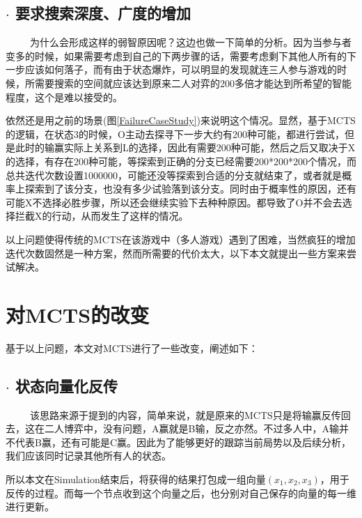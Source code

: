 \documentclass[9pt,twocolumn,twoside]{osajnl}
\begin{document}
\subsection{$\cdot$ 要求搜索深度、广度的增加}

\begin{adjustwidth}{2em}{}
	\ \ \ \ \
	为什么会形成这样的弱智原因呢？这边也做一下简单的分析。因为当参与者变多的时候，如果需要考虑到自己的下两步骤的话，需要考虑剩下其他人所有的下一步应该如何落子，而有由于状态爆炸，可以明显的发现就连三人参与游戏的时候，所需要搜索的空间就应该达到原来二人对弈的200多倍才能达到所希望的智能程度，这个是难以接受的。
	
	依然还是用之前的场景(图\ref{FailureCaseStudy})来说明这个情况。显然，基于MCTS的逻辑，在状态3的时候，O主动去探寻下一步大约有200种可能，都进行尝试，但是此时的输赢实际上关系到L的选择，因此有需要200种可能，然后之后又取决于X的选择，有存在200种可能，等探索到正确的分支已经需要200*200*200个情况，而总共迭代次数设置1000000，可能还没等探索到合适的分支就结束了，或者就是概率上探索到了该分支，也没有多少试验落到该分支。同时由于概率性的原因，还有可能X不选择必胜步骤，所以还会继续实验下去种种原因。都导致了O并不会去选择拦截X的行动，从而发生了这样的情况。
	
\end{adjustwidth}

以上问题使得传统的MCTS在该游戏中（多人游戏）遇到了困难，当然疯狂的增加迭代次数固然是一种方案，然而所需要的代价太大，以下本文就提出一些方案来尝试解决。

\section{对MCTS的改变}
基于以上问题，本文对MCTS进行了一些改变，阐述如下：
\subsection{$\cdot$ 状态向量化反传\cite{MCTSMPG}}
\begin{adjustwidth}{2em}{}
	\ \ \ \ \
该思路来源于\cite{MCTSMPG}提到的内容，简单来说，就是原来的MCTS只是将输赢反传回去，这在二人博弈中，没有问题，A赢就是B输，反之亦然。不过多人中，A输并不代表B赢，还有可能是C赢。因此为了能够更好的跟踪当前局势以及后续分析，我们应该同时记录其他所有人的状态。

所以本文在Simulation结束后，将获得的结果打包成一组向量$(x_1,x_2,x_3)$，用于反传的过程。而每一个节点收到这个向量之后，也分别对自己保存的向量的每一维进行更新。
\end{adjustwidth}
\end{document}

